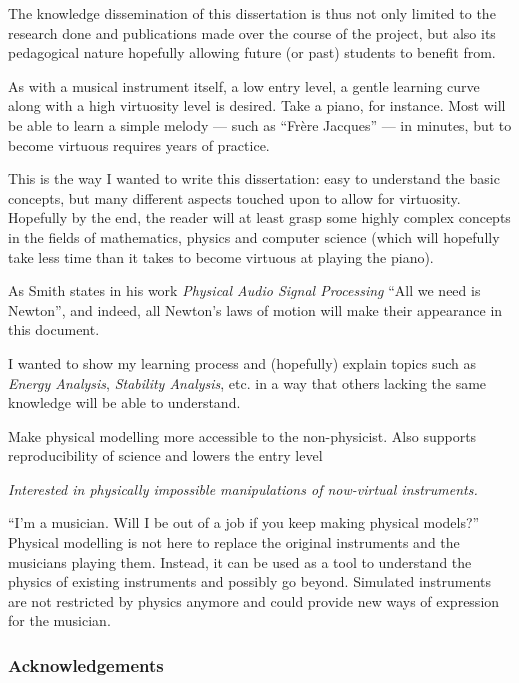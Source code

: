 The knowledge dissemination of this dissertation is thus not only limited to the research done and publications made over the course of the project, but also its pedagogical nature hopefully allowing future (or past) students to benefit from.

As with a musical instrument itself, a low entry level, a gentle learning curve along with a high virtuosity level is desired. Take a piano, for instance. Most will be able to learn a simple melody — such as “Fr\`ere Jacques” — in minutes, but to become virtuous requires years of practice.

This is the way I wanted to write this dissertation: easy to understand the basic concepts, but many different aspects touched upon to allow for virtuosity. Hopefully by the end, the reader will at least grasp some highly complex concepts in the fields of mathematics, physics and computer science (which will hopefully take less time than it takes to become virtuous at playing the piano). 

As Smith states in his work \textit{Physical Audio Signal Processing} \cite{Smith2010b} ``All we need is Newton'', and indeed, all Newton's laws of motion will make their appearance in this document.


I wanted to show my learning process and (hopefully) explain topics such as \textit{Energy Analysis}, \textit{Stability Analysis}, etc. in a way that others lacking the same knowledge %
will be able to understand.

Make physical modelling more accessible to the non-physicist. Also supports reproducibility of science and lowers the entry level   


\textit{Interested in physically impossible manipulations of now-virtual instruments.}


 ``I'm a musician. Will I be out of a job if you keep making physical models?'' Physical modelling is not here to replace the original instruments and the musicians playing them. Instead, it can be used as a tool to understand the physics of existing instruments and possibly go beyond. Simulated instruments are not restricted by physics anymore and could provide new ways of expression for the musician.

\subsubsection{Acknowledgements}

